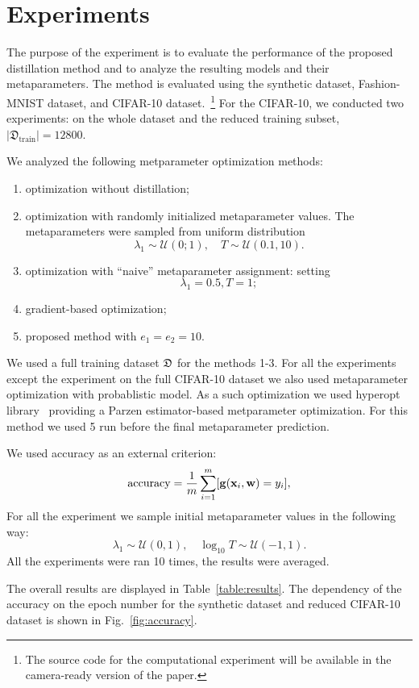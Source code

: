 \documentclass[runningheads]{llncs}
\begin{document}
\section{Experiments}
The purpose of the experiment is to evaluate the performance of the proposed distillation method and to analyze the resulting models and their metaparameters. The method is evaluated using the synthetic dataset, Fashion-MNIST dataset, and CIFAR-10 dataset.~\footnote{The source code for the computational experiment will be available in the camera-ready version of the paper.} For the CIFAR-10, we conducted two experiments: on the whole dataset and the reduced training subset, $|\mathfrak{D}_\text{train}|=12800$. 


We analyzed the following metparameter optimization methods:
\begin{enumerate}[{1)}]
    \item optimization without distillation;
    \item optimization with randomly initialized metaparameter values. The metaparameters were sampled from uniform distribution $$\lambda_1 \sim \mathcal{U}(0;1), \quad T \sim \mathcal{U}(0.1, 10).$$
    \item optimization with ``naive'' metaparameter assignment: setting $$\lambda_1 = 0.5, T = 1;$$
    \item gradient-based optimization;
    \item proposed method with $e_1=e_2=10$.
\end{enumerate}

We used a full training dataset $\mathfrak{D}$ for the methods 1-3. For all the experiments except the experiment on the full  CIFAR-10 dataset we also used metaparameter optimization with probablistic model. As a such optimization we used hyperopt library~\cite{bergstra2013making} providing a Parzen estimator-based metparameter optimization. For this method we used 5 run before the final metaparameter prediction.

We used accuracy as an external criterion:
$$
    \text{accuracy} = \frac{1}{m}\sum\limits_{i=1}^m [\mathbf{g}(\mathbf{x}_i, \mathbf{w}) = y_i],
$$
For all the experiment we sample initial metaparameter values in the following way: 
$$\lambda_1 \sim \mathcal{U}(0,1),\quad \log_{10} T \sim \mathcal{U}(-1, 1).$$ All the experiments were ran 10 times, the results were averaged. 

The overall results are displayed in Table~\ref{table:results}. The dependency of the accuracy on the epoch number for the synthetic dataset and reduced CIFAR-10 dataset is shown in Fig.~\ref{fig:accuracy}.
\end{document}
